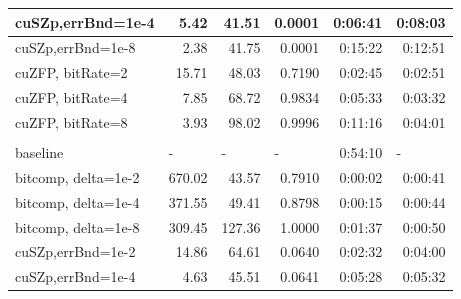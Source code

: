 \documentclass[Ingles,Final]{ic-tese-v3}
\begin{document}
\begin{table}[h!]
\begin{tabular}{|lrrrrr|}
\multicolumn{1}{|l|}{cuSZp,errBnd=1e-4} &
  \multicolumn{1}{r|}{5.42} &
  \multicolumn{1}{r|}{41.51} &
  \multicolumn{1}{r|}{0.0001} &
  \multicolumn{1}{r|}{0:06:41} &
  0:08:03 \\ \hline
\multicolumn{1}{|l|}{cuSZp,errBnd=1e-8} &
  \multicolumn{1}{r|}{2.38} &
  \multicolumn{1}{r|}{41.75} &
  \multicolumn{1}{r|}{0.0001} &
  \multicolumn{1}{r|}{0:15:22} &
  0:12:51 \\ \hline
\multicolumn{1}{|l|}{cuZFP, bitRate=2} &
  \multicolumn{1}{r|}{15.71} &
  \multicolumn{1}{r|}{48.03} &
  \multicolumn{1}{r|}{0.7190} &
  \multicolumn{1}{r|}{0:02:45} &
  0:02:51 \\ \hline
\multicolumn{1}{|l|}{cuZFP, bitRate=4} &
  \multicolumn{1}{r|}{7.85} &
  \multicolumn{1}{r|}{68.72} &
  \multicolumn{1}{r|}{0.9834} &
  \multicolumn{1}{r|}{0:05:33} &
  0:03:32 \\ \hline
\multicolumn{1}{|l|}{cuZFP, bitRate=8} &
  \multicolumn{1}{r|}{3.93} &
  \multicolumn{1}{r|}{98.02} &
  \multicolumn{1}{r|}{0.9996} &
  \multicolumn{1}{r|}{0:11:16} &
  0:04:01 \\ \hline
\rowcolor[HTML]{C0C0C0} 
\multicolumn{6}{|l|}{\cellcolor[HTML]{C0C0C0}\textbf{Salt}} \\ \hline
\multicolumn{1}{|l|}{baseline} &
  \multicolumn{1}{l|}{-} &
  \multicolumn{1}{l|}{-} &
  \multicolumn{1}{l|}{-} &
  \multicolumn{1}{r|}{0:54:10} &
  \multicolumn{1}{l|}{-} \\ \hline
\multicolumn{1}{|l|}{bitcomp, delta=1e-2} &
  \multicolumn{1}{r|}{670.02} &
  \multicolumn{1}{r|}{43.57} &
  \multicolumn{1}{r|}{0.7910} &
  \multicolumn{1}{r|}{0:00:02} &
  0:00:41 \\ \hline
\multicolumn{1}{|l|}{bitcomp, delta=1e-4} &
  \multicolumn{1}{r|}{371.55} &
  \multicolumn{1}{r|}{49.41} &
  \multicolumn{1}{r|}{0.8798} &
  \multicolumn{1}{r|}{0:00:15} &
  0:00:44 \\ \hline
\multicolumn{1}{|l|}{bitcomp, delta=1e-8} &
  \multicolumn{1}{r|}{309.45} &
  \multicolumn{1}{r|}{127.36} &
  \multicolumn{1}{r|}{1.0000} &
  \multicolumn{1}{r|}{0:01:37} &
  0:00:50 \\ \hline
\multicolumn{1}{|l|}{cuSZp,errBnd=1e-2} &
  \multicolumn{1}{r|}{14.86} &
  \multicolumn{1}{r|}{64.61} &
  \multicolumn{1}{r|}{0.0640} &
  \multicolumn{1}{r|}{0:02:32} &
  0:04:00 \\ \hline
\multicolumn{1}{|l|}{cuSZp,errBnd=1e-4} &
  \multicolumn{1}{r|}{4.63} &
  \multicolumn{1}{r|}{45.51} &
  \multicolumn{1}{r|}{0.0641} &
  \multicolumn{1}{r|}{0:05:28} &
  0:05:32 \\ \hline

\end{tabular}
\end{table}
\end{document}
